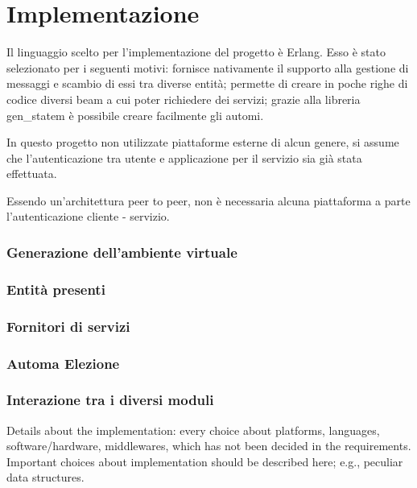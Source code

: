 
\chapter{Implementazione}

Il linguaggio scelto per l'implementazione del progetto è Erlang. Esso è stato selezionato per i seguenti motivi: fornisce nativamente il supporto alla gestione di messaggi e scambio di essi tra diverse entità; permette di creare in poche righe di codice diversi beam a cui poter richiedere dei servizi; grazie alla libreria gen\_statem è possibile creare facilmente gli automi.

In questo progetto non utilizzate piattaforme esterne di alcun genere, si assume che l'autenticazione tra utente e applicazione per il servizio sia già stata effettuata.

Essendo un'architettura peer to peer, non è necessaria alcuna piattaforma a parte l'autenticazione cliente - servizio.

\subsection{Generazione dell'ambiente virtuale}

\subsection{Entità presenti}

\subsection{Fornitori di servizi}

\subsection{Automa Elezione}

\subsection{Interazione tra i diversi moduli}


Details about the implementation: every choice about platforms, languages, software/hardware, middlewares, which has not been decided in the requirements.
Important choices about implementation should be described here; e.g., peculiar data structures.